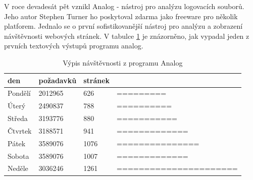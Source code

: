 \documentclass[bc,male,java,dept456]{diploma}						%
\begin{document}
V roce devadesát pět vznikl Analog - nástroj pro analýzu logovacích souborů. Jeho autor Stephen Turner ho poskytoval zdarma jako freeware pro několik platforem. Jednalo se o první sofistikovanější nástroj pro analýzu a zobrazení návštěvnosti webových stránek. V tabulce \ref{table:analog_output} je znázorněno, jak vypadal jeden z prvních textových výstupů programu analog.

\begin{table}[h]
	\centering	
\begin{tabular}{p{2cm} p{3cm} p{2cm} p{5cm}}
den&požadavků&stránek&\\
\hline
Pondělí			& 2012965			& 626	& ========= \\
Úterý			& 2490837			& 788	& ========== \\
Středa			& 3193776			& 880	& =========== \\
Čtvrtek			& 3188571			& 941	& ============= \\
Pátek			& 3589076			& 1076	& ===============\\
Sobota			& 3589076			& 1007	& ============= \\
Neděle			& 3036246			& 1261	& ======================\\
\end{tabular}

	\caption{Výpis návštěvnosti z programu Analog} 
	\label{table:analog_output}
\end{table}
\end{document}
